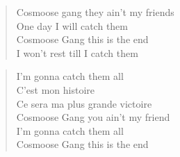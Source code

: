 \begin{verse}
Cosmoose gang they ain't my friends\\
One day I will catch them\\
Cosmoose Gang this is the end\\
I won't rest till I catch them
\end{verse}

\begin{verse}
I'm gonna catch them all\\
C'est mon histoire\\
Ce sera ma plus grande victoire\\
Cosmoose Gang you ain't my friend\\
I'm gonna catch them all \\
Cosmoose Gang this is the end
\end{verse}

\clearpage



